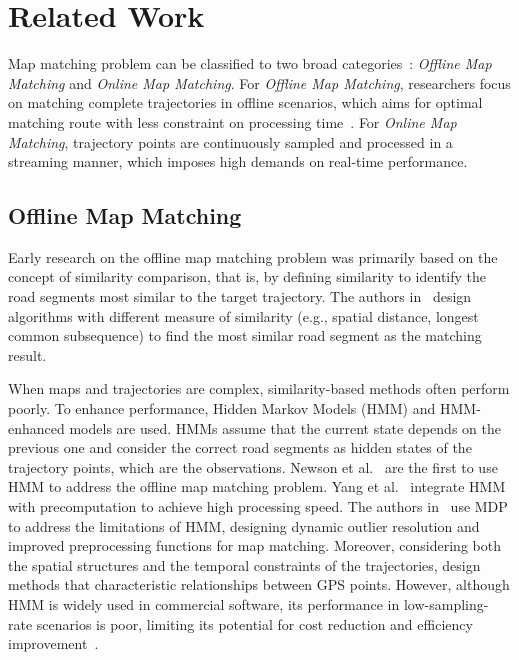 \section{Related Work}
Map matching problem can be classified to two broad categories~\cite{mmsurvey}: \textit{Offline Map Matching} and \textit{Online Map Matching}. For \textit{Offline Map Matching}, researchers focus on matching complete trajectories in offline scenarios, which aims for optimal matching route with less constraint on processing time~\cite{survey_magzine}. For \textit{Online Map Matching}, trajectory points are continuously sampled and processed in a streaming manner, which imposes high demands on real-time performance.
\subsection{Offline Map Matching}
Early research on the offline map matching problem was primarily based on the concept of similarity comparison, that is, by defining similarity to identify the road segments most similar to the target trajectory. The authors in~\cite{currentmm, icde12, trajSeg} design algorithms with different measure of similarity (e.g., spatial distance, longest common subsequence) to find the most similar road segment as the matching result. 

When maps and trajectories are complex, similarity-based methods often perform poorly. To enhance performance, Hidden Markov Models (HMM) and HMM-enhanced models are used. HMMs assume that the current state depends on the previous one and consider the correct road segments as hidden states of the trajectory points, which are the observations.
Newson et al.~\cite{HMM} are the first to use HMM to address the offline map matching problem. 
Yang et al.~\cite{FMM} integrate HMM with precomputation to achieve high processing speed. 
The authors in~\cite{MDPMM} use MDP to address the limitations of HMM, designing dynamic outlier resolution and improved preprocessing functions for map matching.
Moreover, considering both the spatial structures and the temporal constraints of the trajectories, \cite{stmatching, impstmatching, ifmatching} design methods that characteristic relationships between GPS points.
However, although HMM is widely used in commercial software, its performance in low-sampling-rate scenarios is poor, limiting its potential for cost reduction and efficiency improvement~\cite{praGuide}.

